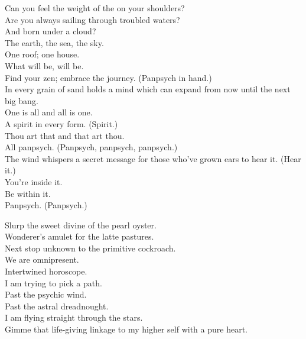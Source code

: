


Can you feel the weight of the  on your shoulders? \\
Are you always sailing through troubled waters? \\
And born under a cloud? \\
The earth, the sea, the sky. \\
One roof; one house. \\

What will be, will be. \\
Find your zen; embrace the journey. (Panpsych in hand.) \\
In every grain of sand holds a mind which can expand from now until the next big bang. \\

One is all and all is one. \\
A spirit in every form. (Spirit.) \\
Thou art that and that art thou. \\
All panpsych. (Panpsych, panpsych, panpsych.) \\
The wind whispers a secret message for those who've grown ears to hear it. (Hear it.) \\
You're inside it. \\
Be within it. \\
Panpsych. (Panpsych.) \\


Slurp the sweet divine of the pearl oyster. \\
Wonderer's amulet for the latte pastures. \\
Next stop unknown to the primitive cockroach. \\
We are omnipresent. \\
Intertwined horoscope. \\

I am trying to pick a path. \\
Past the psychic wind. \\
Past the astral dreadnought. \\
I am flying straight through the stars. \\
Gimme that life-giving linkage to my higher self with a pure heart. \\

